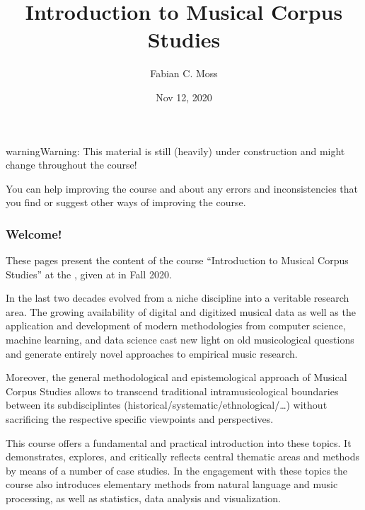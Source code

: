 \documentclass[letterpaper,10pt,english]{sphinxmanual}
\title{Introduction to Musical Corpus Studies}
\date{Nov 12, 2020}
\author{Fabian C.\@{} Moss}
\begin{document}
\pagestyle{empty}
\sphinxmaketitle
\pagestyle{plain}
\sphinxtableofcontents
\pagestyle{normal}
\label{\detokenize{index::doc}}



\begin{sphinxadmonition}{warning}{Warning:}
This material is still (heavily) under construction and might change throughout the course!

You can help improving the course and  about any errors and inconsistencies that you find
or suggest other ways of improving the course.
\end{sphinxadmonition}
\subsubsection*{Welcome!}

These pages present the content of the course “Introduction to Musical Corpus Studies” at the ,
given at  in Fall 2020.

In the last two decades  evolved from a niche discipline into a veritable research area.
The growing availability of digital and digitized musical data as well as the application and development of modern
methodologies from computer science, machine learning, and data science cast new light on old musicological questions
and generate entirely novel approaches to empirical music research.

Moreover, the general methodological and epistemological approach of Musical Corpus Studies allows to transcend traditional
intra\sphinxhyphen{}musicological boundaries between its sub\sphinxhyphen{}disciplintes (historical/systematic/ethnological/…) without sacrificing the
respective specific viewpoints and perspectives.

This course offers a fundamental and practical introduction into these topics.
It demonstrates, explores, and critically reflects central thematic areas and methods by means of a number of case studies.
In the engagement with these topics the course also introduces elementary methods from natural language and music processing,
as well as statistics, data analysis and visualization.
\end{document}
